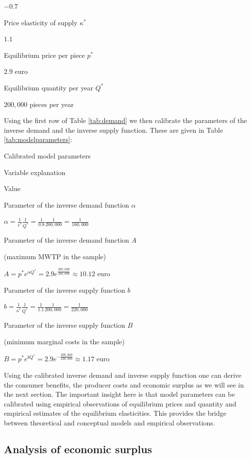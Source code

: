 \documentclass[
]{book}
\begin{document}
\(-0.7\)

Price elasticity of supply \(\kappa^\ast\)

\(1.1\)

Equilibrium price per piece \(p^\ast\)

\(2.9\) euro

Equilibrium quantity per year \(Q^\ast\)

\(200,000\) pieces per year

Using the first row of Table \ref{tab:demand} we then calibrate the parameters of the inverse demand and the inverse supply function. These are given in Table \ref{tab:modelparameters}:

\label{tab:modelparameters}Calibrated model parameters

Variable explanation

Value

Parameter of the inverse demand function \(\alpha\)

\(\alpha = \frac{1}{\epsilon^\ast}\frac{1}{Q^\ast} = \frac{1}{0.8}\frac{1}{200,000} = \frac{1}{160,000}\)

Parameter of the inverse demand function \(A\)

(maximum MWTP in the sample)

\(A = p^\ast e^{\alpha Q^\ast} = 2.9 e^{\frac{200,000}{160,000}} \approx 10.12 \text{ euro}\)

Parameter of the inverse supply function \(b\)

\(b = \frac{1}{\kappa^\ast}\frac{1}{Q^{\ast}} = \frac{1}{1.1}\frac{1}{200,000} = \frac{1}{220,000}\)

Parameter of the inverse supply function \(B\)

(minimum marginal costs in the sample)

\(B = p^\ast e^{b Q^\ast} = 2.9 e^{-\frac{200,000}{220,000}} \approx 1.17 \text{ euro}\)

Using the calibrated inverse demand and inverse supply function one can derive the consumer benefits, the producer costs and economic surplus as we will see in the next section. The important insight here is that model parameters can be calibrated using empirical observations of equilibrium prices and quantity and empirical estimates of the equilibrium elasticities. This provides the bridge between theoretical and conceptual models and empirical observations.

\hypertarget{analysis-of-economic-surplus-1}{%
\subsection{Analysis of economic surplus}\label{analysis-of-economic-surplus-1}}
\end{document}
